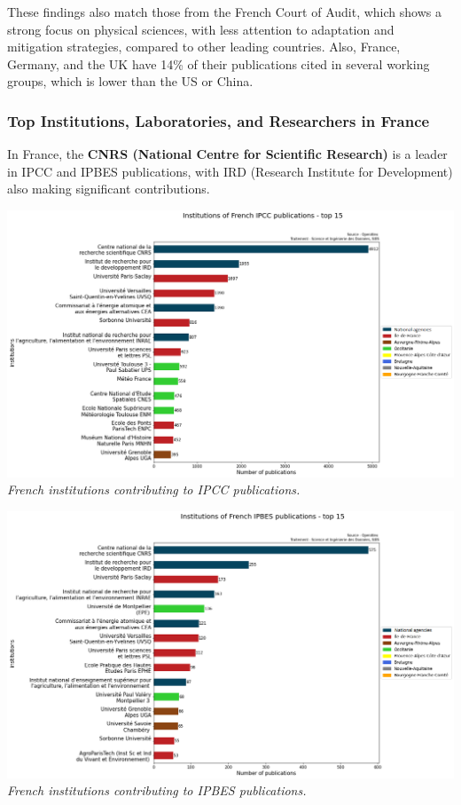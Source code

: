 \documentclass[
]{article}
\begin{document}
These findings also match those from the French Court of Audit, which
shows a strong focus on physical sciences, with less attention to
adaptation and mitigation strategies, compared to other leading
countries. Also, France, Germany, and the UK have 14\% of their
publications cited in several working groups, which is lower than the US
or China.

\hypertarget{top-institutions-laboratories-and-researchers-in-france}{%
\subsubsection{Top Institutions, Laboratories, and Researchers in
France}\label{top-institutions-laboratories-and-researchers-in-france}}

In France, the \textbf{CNRS (National Centre for Scientific Research)}
is a leader in IPCC and IPBES publications, with IRD (Research Institute
for Development) also making significant contributions.

\includegraphics{./images/teds_ipcc_institutions.png} \emph{French
institutions contributing to IPCC publications.}

\includegraphics{./images/teds_ipbes_institutions.png} \emph{French
institutions contributing to IPBES publications.}
\end{document}

